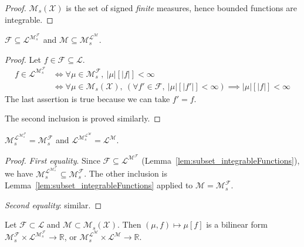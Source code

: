 \begin{proof}
$\mathcal{M}_s(\mathcal{X})$ is the set of signed \emph{finite} measures, hence bounded functions are integrable.
\end{proof}


\begin{lemma}\label{lem:subset_integrableFunctions}
$\mathcal{F} \subseteq \mathcal{L}^{\mathcal{M}_s^{\mathcal{F}}}$ and $\mathcal{M} \subseteq \mathcal{M}_s^{\mathcal{L}^{\mathcal{M}}}$.
\end{lemma}

\begin{proof}
Let $f \in \mathcal{F} \subseteq \mathcal{L}$.
\begin{align*}
  f \in \mathcal{L}^{\mathcal{M}_s^{\mathcal{F}}}
  &\iff \forall \mu \in \mathcal{M}_s^{\mathcal{F}}, \: \vert \mu \vert[\vert f \vert] < \infty
  \\
  &\iff \forall \mu \in \mathcal{M}_s(\mathcal{X}), \: (\forall f' \in \mathcal{F}, \: \vert \mu \vert[\vert f' \vert] < \infty) \implies \vert \mu \vert[\vert f \vert] < \infty
\end{align*}
The last assertion is true because we can take $f' = f$.

The second inclusion is proved similarly.
\end{proof}


\begin{lemma}\label{lem:stable_integrableFunctions}
$\mathcal{M}_s^{\mathcal{L}^{\mathcal{M}_s^{\mathcal{F}}}} = \mathcal{M}_s^{\mathcal{F}}$ and $\mathcal{L}^{\mathcal{M}_s^{\mathcal{L}^{\mathcal{M}}}} = \mathcal{L}^{\mathcal{M}}$.
\end{lemma}

\begin{proof}
\emph{First equality}.
Since $\mathcal{F} \subseteq \mathcal{L}^{\mathcal{M}^{\mathcal{F}}}$ (Lemma~\ref{lem:subset_integrableFunctions}), we have $\mathcal{M}_s^{\mathcal{L}^{\mathcal{M}_s^{\mathcal{F}}}} \subseteq \mathcal{M}_s^{\mathcal{F}}$.
The other inclusion is Lemma~\ref{lem:subset_integrableFunctions} applied to $\mathcal{M} = \mathcal{M}_s^{\mathcal{F}}$.

\emph{Second equality}: similar.
\end{proof}


\begin{lemma}\label{lem:integral_bilin}
Let $\mathcal{F} \subset \mathcal{L}$ and $\mathcal{M} \subset \mathcal{M}_s(\mathcal{X})$.
Then $(\mu, f) \mapsto \mu[f]$ is a bilinear form $\mathcal{M}_s^{\mathcal{F}} \times \mathcal{L}^{\mathcal{M}_s^{\mathcal{F}}} \to \mathbb{R}$, or $\mathcal{M}_s^{\mathcal{L}^{\mathcal{M}}} \times \mathcal{L}^{\mathcal{M}} \to \mathbb{R}$.
\end{lemma}

